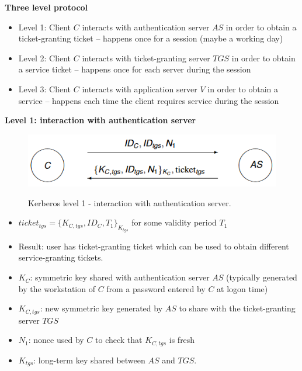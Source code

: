 \documentclass{article}
\begin{document}
\textbf{Three level protocol}

\begin{itemize}
    \item Level 1: Client $C$ interacts with authentication server $AS$ in order to obtain a ticket-granting ticket – happens once for a session (maybe a working day)
    \item Level 2: Client $C$ interacts with ticket-granting server $TGS$ in order to obtain a service ticket – happens once for each server during the session
    \item Level 3: Client $C$ interacts with application server $V$ in order to obtain a service – happens each time the client requires service during the session
\end{itemize}

\textbf{Level 1: interaction with authentication server}

\noindent\begin{minipage}{0.6\textwidth}%
\begin{figure}[H]
\centering
\includegraphics[scale=0.72]{Images/kerberoslevel1.png}
\label{fig:fround}
\caption{Kerberos level 1 - interaction with authentication server.}
\end{figure}
\end{minipage}%
\hfill%
\begin{minipage}{0.35\textwidth}
\begin{itemize}
    \item $ticket_{tgs}=\{K_{C,tgs},ID_C,T_1\}_{K_{tgs}}$  for some validity period $T_1$
    \item Result: user has ticket-granting ticket which can be used to obtain different service-granting tickets.
\end{itemize}
\end{minipage}
\begin{itemize}
    \item $K_C$: symmetric key shared with authentication server $AS$ (typically generated by the workstation of $C$ from a password entered by $C$ at logon time)
    \item $K_{C,tgs}$: new symmetric key generated by $AS$ to share with the ticket-granting server $TGS$
    \item $N_1$: nonce used by $C$ to check that $K_{C,tgs}$ is fresh
    \item $K_{tgs}$: long-term key shared between $AS$ and $TGS$.
\end{itemize}
\end{document}
